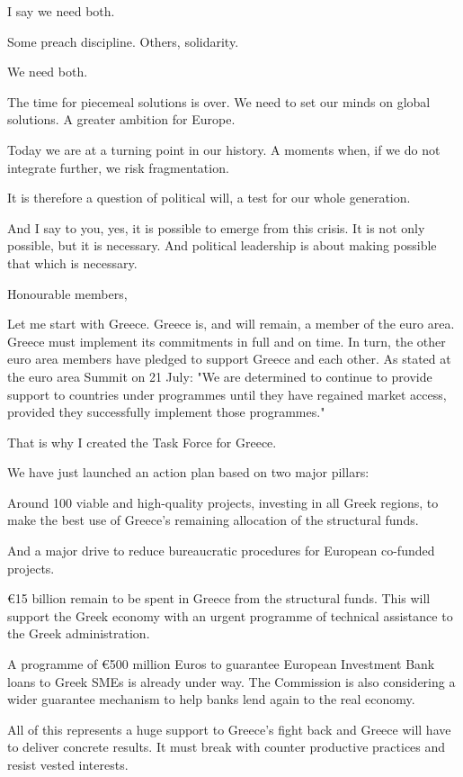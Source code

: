 \documentclass[a4paper,11pt]{article}
\begin{document}
I say we need both.

Some preach discipline. Others, solidarity.

We need both.

The time for piecemeal solutions is over. We need to set our minds on global solutions. A greater ambition for Europe.

Today we are at a turning point in our history. A moments when, if we do not integrate further, we risk fragmentation.

It is therefore a question of political will, a test for our whole generation.

And I say to you, yes, it is possible to emerge from this crisis. It is not only possible, but it is necessary. And political leadership is about making possible that which is necessary.

Honourable members,

Let me start with Greece. Greece is, and will remain, a member of the euro area. Greece must implement its commitments in full and on time. In turn, the other euro area members have pledged to support Greece and each other. As stated at the euro area Summit on 21 July: "We are determined to continue to provide support to countries under programmes until they have regained market access, provided they successfully implement those programmes."

That is why I created the Task Force for Greece.

We have just launched an action plan based on two major pillars:

    Around 100 viable and high-quality projects, investing in all Greek regions, to make the best use of Greece's remaining allocation of the structural funds.

    And a major drive to reduce bureaucratic procedures for European co-funded projects.

\euro 15 billion remain to be spent in Greece from the structural funds. This will support the Greek economy with an urgent programme of technical assistance to the Greek administration.

A programme of \euro 500 million Euros to guarantee European Investment Bank loans to Greek SMEs is already under way. The Commission is also considering a wider guarantee mechanism to help banks lend again to the real economy.

All of this represents a huge support to Greece's fight back and Greece will have to deliver concrete results. It must break with counter productive practices and resist vested interests.
\end{document}
